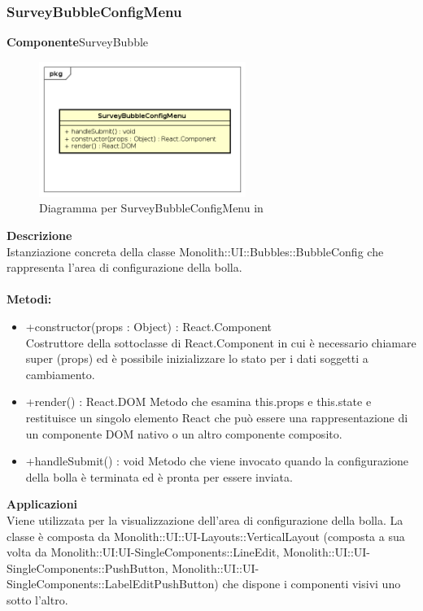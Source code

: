 \subsubsection{SurveyBubbleConfigMenu}
\textbf{Componente}SurveyBubble\\
   \FloatBarrier
   \begin{figure}[ht]
   \centering
   \includegraphics[width=0.6\textwidth]{img/single-SurveyBubbleConfigMenu}
   \caption{{Diagramma per SurveyBubbleConfigMenu in }}
\end{figure}
\FloatBarrier
\textbf{Descrizione}\\
Istanziazione concreta della classe Monolith::UI::Bubbles::BubbleConfig che rappresenta l'area di configurazione della bolla. 
\\
\\
\textbf{Metodi:} 
\begin{itemize}
\item +constructor(props : Object) : React.Component 
\\
Costruttore della sottoclasse di React.Component in cui è necessario chiamare super (props) ed è possibile inizializzare lo stato per i dati soggetti a cambiamento.

\item +render() : React.DOM
Metodo che esamina this.props e this.state e restituisce un singolo elemento React che può essere una rappresentazione di un componente DOM nativo o un altro componente composito.

\item +handleSubmit() : void
Metodo che viene invocato quando la configurazione della bolla è terminata ed è pronta per essere inviata.

\end{itemize} 


\textbf{Applicazioni}\\
Viene utilizzata per la visualizzazione dell'area di configurazione della bolla. 
La classe è composta da Monolith::UI::UI-Layouts::VerticalLayout (composta a sua volta da Monolith::UI:UI-SingleComponents::LineEdit, Monolith::UI::UI-SingleComponents::PushButton, Monolith::UI::UI-SingleComponents::LabelEditPushButton) che dispone i componenti visivi uno sotto l'altro. 


